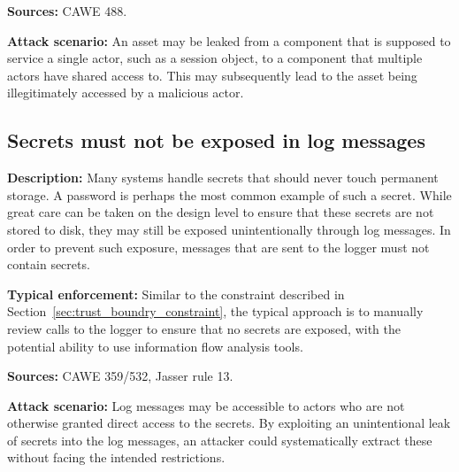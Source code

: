  \textbf{Sources:} CAWE 488.
 
 \textbf{Attack scenario:}
 An asset may be leaked from a component that is supposed to service a single actor, such as a session object, to a component that multiple actors have shared access to. This may subsequently lead to the asset being illegitimately accessed by a malicious actor.

\subsection{Secrets must not be exposed in log messages} 

\textbf{Description:} Many systems handle secrets that should never touch permanent storage. A password is perhaps the most common example of such a secret. While great care can be taken on the design level to ensure that these secrets are not stored to disk, they may still be exposed unintentionally through log messages. In order to prevent such exposure, messages that are sent to the logger must not contain secrets.

 \textbf{Typical enforcement:} Similar to the constraint described in Section~\ref{sec:trust_boundry_constraint}, the typical approach is to manually review calls to the logger to ensure that no secrets are exposed, with the potential ability to use information flow analysis tools.
 
 \textbf{Sources:} CAWE 359/532, Jasser rule 13.
 
 \textbf{Attack scenario:} Log messages may be accessible to actors who are not otherwise granted direct access to the secrets. By exploiting an unintentional leak of secrets into the log messages, an attacker could systematically extract these without facing the intended restrictions.